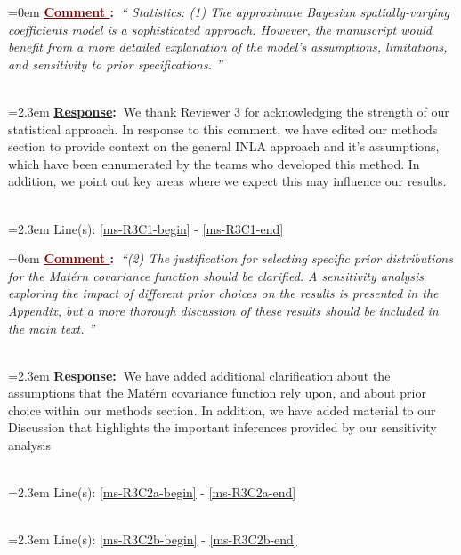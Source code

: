 \documentclass[12pt]{article}
\newcounter{cN}
\newcommand{\comment}[1]{
	\vspace{2em}
	\refstepcounter{cN} %
	\noindent \hangindent=0em \textbf{\textcolor{Maroon}{\uline{Comment \thecN}:~}}\emph{``#1''}
	}
\newcommand{\response}[1]{
	\\[0.25em]
	\hangindent=2.3em \textbf{\textcolor{NavyBlue}{\uline{Response}:~}}#1
	}
\newcommand{\linesref}[2]{
		\\[0.25em]
	\hangindent=2.3em {\color{Mahogany} Line(s): \ref{#1} - \ref{#2}}
}
\begin{document}
\comment{ Statistics: (1) The approximate Bayesian spatially-varying coefficients model is a sophisticated approach. However, the manuscript would benefit from a more detailed explanation of the model's assumptions, limitations, and sensitivity to prior specifications. }
	\response{We thank Reviewer 3 for acknowledging the strength of our statistical approach. 
		In response to this comment, we have edited our methods section to provide context on the general INLA approach and it's assumptions, which have been ennumerated by the teams who developed this method. In addition, we point out key areas where we expect this may influence our results.}
	\linesref{ms-R3C1-begin}{ms-R3C1-end}
	
	
\comment{(2) The justification for selecting specific prior distributions for the Matérn covariance function should be clarified. A sensitivity analysis exploring the impact of different prior choices on the results is presented in the Appendix, but a more thorough discussion of these results should be included in the main text. }
	\response{We have added additional clarification about the assumptions that the Matérn covariance function rely upon, and about prior choice within our methods section. In addition, we have added material to our Discussion that highlights the important inferences provided by our sensitivity analysis}
	\linesref{ms-R3C2a-begin}{ms-R3C2a-end}
	\linesref{ms-R3C2b-begin}{ms-R3C2b-end}
\end{document}
